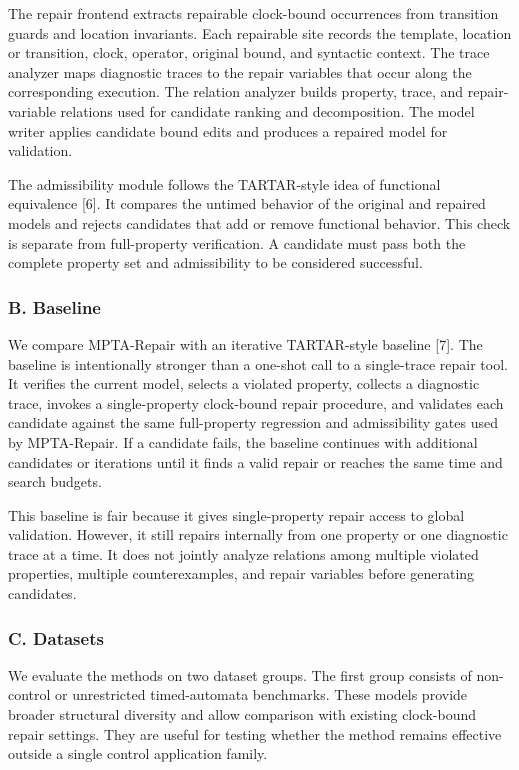 \documentclass[
]{article}
\begin{document}
The repair frontend extracts repairable clock-bound occurrences from
transition guards and location invariants. Each repairable site records
the template, location or transition, clock, operator, original bound,
and syntactic context. The trace analyzer maps diagnostic traces to the
repair variables that occur along the corresponding execution. The
relation analyzer builds property, trace, and repair-variable relations
used for candidate ranking and decomposition. The model writer applies
candidate bound edits and produces a repaired model for validation.

The admissibility module follows the TARTAR-style idea of functional
equivalence {[}6{]}. It compares the untimed behavior of the original
and repaired models and rejects candidates that add or remove functional
behavior. This check is separate from full-property verification. A
candidate must pass both the complete property set and admissibility to
be considered successful.

\subsubsection{B. Baseline}\label{b.-baseline}

We compare MPTA-Repair with an iterative TARTAR-style baseline {[}7{]}.
The baseline is intentionally stronger than a one-shot call to a
single-trace repair tool. It verifies the current model, selects a
violated property, collects a diagnostic trace, invokes a
single-property clock-bound repair procedure, and validates each
candidate against the same full-property regression and admissibility
gates used by MPTA-Repair. If a candidate fails, the baseline continues
with additional candidates or iterations until it finds a valid repair
or reaches the same time and search budgets.

This baseline is fair because it gives single-property repair access to
global validation. However, it still repairs internally from one
property or one diagnostic trace at a time. It does not jointly analyze
relations among multiple violated properties, multiple counterexamples,
and repair variables before generating candidates.

\subsubsection{C. Datasets}\label{c.-datasets}

We evaluate the methods on two dataset groups. The first group consists
of non-control or unrestricted timed-automata benchmarks. These models
provide broader structural diversity and allow comparison with existing
clock-bound repair settings. They are useful for testing whether the
method remains effective outside a single control application family.
\end{document}
